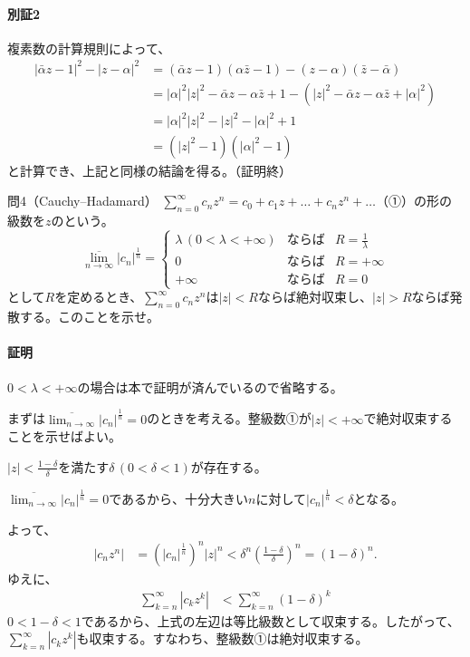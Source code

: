 \paragraph{別証2}
複素数の計算規則によって、
\begin{align*}
    |\bar{\alpha}z-1|^2-|z-\alpha|^2
    &=(\bar{\alpha}z-1)(\alpha\bar{z}-1)-(z-\alpha)(\bar{z}-\bar{\alpha})\\
    &=|\alpha|^2|z|^2-\bar{\alpha}z-\alpha\bar{z}+1-(|z|^2-\bar{\alpha}z-\alpha\bar{z}+|\alpha|^2)\\
    &=|\alpha|^2|z|^2-|z|^2-|\alpha|^2+1\\
    &=(|z|^2-1)(|\alpha|^2-1)
\end{align*}
と計算でき、上記と同様の結論を得る。（証明終）

\begin{mysimplebox}{問4（Cauchy--Hadamard）}
    $\sum_{n=0}^\infty c_nz^n=c_0+c_1z+\dots+c_nz^n+\dots$（①）の形の級数を$z$のという。
    \[\overline{\lim_{n\to\infty}}|c_n|^{\frac{1}{n}}=\left\{\begin{array}{lll}
      \lambda  \,(0<\lambda<+\infty) & \mbox{ならば} & R=\frac{1}{\lambda}\\
      0 & \mbox{ならば} & R=+\infty\\
      +\infty & \mbox{ならば} & R=0
    \end{array}\right.\]
    として$R$を定めるとき、$\sum_{n=0}^\infty c_nz^n$は$|z|<R$ならば絶対収束し、$|z|>R$ならば発散する。このことを示せ。
\end{mysimplebox}
\paragraph{証明}
$0<\lambda<+\infty$の場合は本で証明が済んでいるので省略する。

まずは$\displaystyle\overline{\lim_{n\to\infty}}|c_n|^{\frac{1}{n}}=0$のときを考える。整級数①が$|z|<+\infty$で絶対収束することを示せばよい。

$|z|<\frac{1-\delta}{\delta}$を満たす$\delta\,(0<\delta<1)$が存在する。

$\displaystyle\overline{\lim_{n\to\infty}}|c_n|^{\frac{1}{n}}=0$であるから、十分大きい$n$に対して$|c_n|^\frac{1}{n}<\delta$となる。

よって、
\begin{align*}
    |c_nz^n|&=\left(|c_n|^\frac{1}{n}\right)^n|z|^n<\delta^n\left(\frac{1-\delta}{\delta}\right)^n
    =(1-\delta)^n.
\end{align*}
ゆえに、
\begin{align*}
    \sum_{k=n}^\infty |c_kz^k|&<\sum_{k=n}^\infty(1-\delta)^k
\end{align*}
$0<1-\delta<1$であるから、上式の左辺は等比級数として収束する。したがって、$\sum_{k=n}^\infty |c_kz^k|$も収束する。すなわち、整級数①は絶対収束する。

